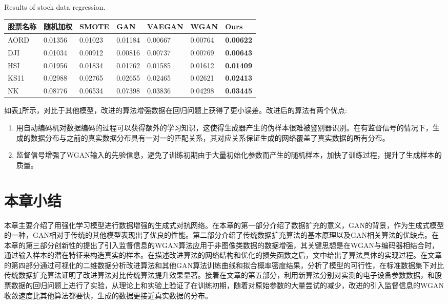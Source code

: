 \begin{table}[htpb]
	\centering
	{Results of stock data regression.}
	\label{tab2}
	\begin{tabular}{lllllll} \toprule		股票名称&随机加权&SMOTE& GAN &  VAEGAN & WGAN &Ours  \\ 
		\midrule
		AORD &0.01356& 0.01023&0.01184 & 0.00667 & 0.00764 &\textbf{0.00622}   \\
		DJI &0.01034&0.00912&0.00816&0.00737&0.00769&\textbf{0.00643}  \\
		HSI &0.01956&0.01834&0.01762&0.01585&0.01612&\textbf{0.01409}  \\
		KS11 &0.02988&0.02765&0.02655&0.02465&0.02621&\textbf{0.02413}\\
		NK  &0.08776&0.06534& 0.07398& 0.03836& 0.04298&\textbf{0.03445} \\
		\bottomrule
	\end{tabular}
\end{table}

如表\ref{tab2}所示，对比于其他模型，改进的算法增强数据在回归问题上获得了更小误差。改进后的算法有两个优点:
\begin{enumerate}
	\item 用自动编码机对数据编码的过程可以获得额外的学习知识，这使得生成器产生的伪样本很难被鉴别器识别。在有监督信号的情况下，生成的数据分布与之前的真实数据分布具有一对一的匹配关系，其对应关系保证生成的网络覆盖了真实数据的所有分布。
	\item 监督信号增强了WGAN输入的先验信息，避免了训练初期由于大量初始化参数而产生的随机样本，加快了训练过程，提升了生成样本的质量。
\end{enumerate}

\section{本章小结}

本章主要介绍了用强化学习模型进行数据增强的生成式对抗网络。在本章的第一部分介绍了数据扩充的意义，GAN的背景，作为生成式模型的一种，GAN相对于传统的其他模型表现出了优良的性能。第二部分介绍了传统数据扩充算法的基本原理以及GAN相关算法的优缺点。在本章的第三部分创新性的提出了引入监督信息的WGAN算法应用于非图像类数据的数据增强，其关键思想是在WGAN与编码器相结合时，通过输入样本的潜在特征来构造真实的样本。在描述改进算法的网络结构和优化的损失函数之后，文中给出了算法具体的实现过程。在文章的第四部分通过可视化的二维数据分析改进算法和其他GAN算法训练曲线和拟合概率密度结果，分析了模型的可行性，在标准数据集下对比传统数据扩充算法证明了改进算法对比传统算法提升效果显著。接着在文章的第五部分，利用新算法分别对实测的电子设备参数数据，和股票数据的回归问题上进行了实验，从理论上和实验上验证了在训练初期，随着对原始参数的大量尝试的减少，改进的引入监督信息的WGAN收敛速度比其他算法都要快，生成的数据更接近真实数据的分布。
